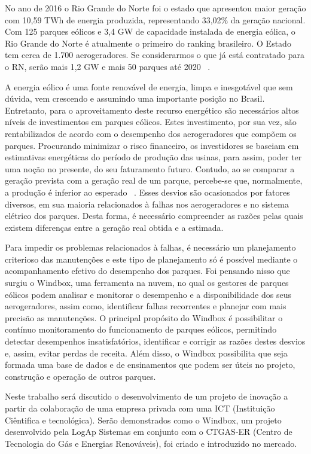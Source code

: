 No ano de 2016 o Rio Grande do Norte foi o estado que apresentou maior geração com 10,59 TWh de energia produzida, representando 33,02\% da geração nacional. Com 125 parques eólicos e 3,4 GW de capacidade instalada de energia eólica, o Rio Grande do Norte é atualmente o primeiro do ranking brasileiro. O Estado tem cerca de 1.700 aerogeradores. Se considerarmos o que já está contratado para o RN, serão mais 1,2 GW e mais 50 parques até 2020 ~\cite{estados-capacidade-instalada}.

A energia eólico é uma fonte renovável de energia, limpa e inesgotável que sem dúvida, vem crescendo e assumindo uma importante posição no Brasil. Entretanto, para o aproveitamento deste recurso energético são necessários altos níveis de investimentos em parques eólicos. Estes investimento, por sua vez, são rentabilizados de acordo com o desempenho dos aerogeradores que compõem os parques. Procurando minimizar o risco financeiro, os investidores se baseiam em estimativas energéticas do período de produção das usinas, para assim, poder ter uma noção no presente, do seu faturamento futuro. Contudo, ao se comparar a geração prevista com a geração real de um parque, percebe-se que, normalmente, a produção é inferior ao esperado ~\cite{ons2015}. Esses desvios são ocasionados por fatores diversos, em sua maioria relacionados à falhas nos aerogeradores e no sistema elétrico dos parques. Desta forma, é necessário compreender as razões pelas quais existem diferenças entre a geração real obtida e a estimada.

Para impedir os problemas relacionados à falhas, é necessário um planejamento criterioso das manutenções e este tipo de planejamento só é possível mediante o acompanhamento efetivo do desempenho dos parques. Foi pensando nisso que surgiu o Windbox, uma ferramenta na nuvem, no qual os gestores de parques eólicos podem analisar e monitorar o desempenho e a disponibilidade dos seus aerogeradores, assim como, identificar falhas recorrentes e planejar com mais precisão as manutenções. O principal propósito do Windbox é possibilitar o contínuo monitoramento do funcionamento de parques eólicos, permitindo detectar desempenhos insatisfatórios, identificar e corrigir as razões destes desvios e, assim, evitar perdas de receita. Além disso, o Windbox possibilita que seja formada uma base de dados e de ensinamentos que podem ser úteis no projeto, construção e operação de outros parques.

Neste trabalho será discutido o desenvolvimento de um projeto de inovação a partir da colaboração de uma empresa privada com uma ICT (Instituição Ciêntifica e tecnológica). Serão demonstrados como o Windbox, um projeto desenvolvido pela LogAp Sistemas em conjunto com o CTGAS-ER (Centro de Tecnologia do Gás e Energias Renováveis), foi criado e introduzido no mercado.

